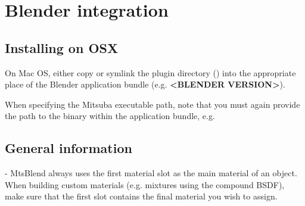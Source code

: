\section{Blender integration}
\subsection{Installing on OSX}
On Mac OS, either copy or symlink the plugin directory () into the appropriate place of the
Blender application bundle (e.g. \textbf{<BLENDER VERSION>}).

When specifying the Mitsuba executable path, note that you must again provide
the path to the binary within the application bundle, e.g. 

\subsection{General information}
- MtsBlend always uses the first material slot as the main material of an
object. When building custom materials (e.g. mixtures using the compound BSDF),
make sure that the first slot contains the final material you wish to assign.

